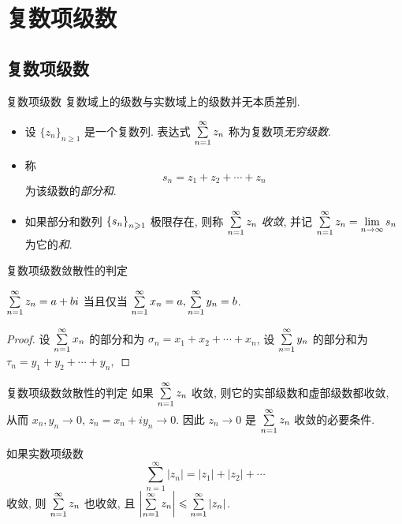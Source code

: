 \section{复数项级数}

\subsection{复数项级数}
\begin{frame}{复数项级数}
\onslide<+->
复数域上的级数与实数域上的级数并无本质差别.
\onslide<+->
\begin{definition}
\begin{itemize}
\item 设 $\{z_n\}_{n\ge1}$ 是一个复数列.
\onslide<+->
表达式 $\sum\limits_{n=1}^\infty z_n$ 称为复数项\emph{无穷级数}.
\item 称
\[s_n=z_1+z_2+\cdots+z_n\]
为该级数的\emph{部分和}.
\item 如果部分和数列 ${\left\{s_n\right\}}_{n\geqslant 1}$ 极限存在, 则称 $\sum\limits_{n=1}^\infty z_n$ \emph{收敛}, 并记 $\sum\limits_{n=1}^\infty z_n=\lim\limits_{n\to\infty}s_n$ 为它的\emph{和}.
\end{itemize}
\end{definition}
\end{frame}


\begin{frame}{复数项级数敛散性的判定}
\beqskip{7pt}
\onslide<+->
\begin{theorem}
$\sum\limits_{n=1}^\infty z_n=a+bi$ 当且仅当 $\sum\limits_{n=1}^\infty x_n=a,\sum\limits_{n=1}^\infty y_n=b$.
\end{theorem}
\onslide<+->
\begin{proof}
设 $\sum\limits_{n=1}^\infty x_n$ 的部分和为 $\sigma_n=x_1+x_2+\cdots+x_n$,
设 $\sum\limits_{n=1}^\infty y_n$ 的部分和为
$\tau_n=y_1+y_2+\cdots+y_n,$
\end{proof}
\endgroup
\end{frame}


\begin{frame}{复数项级数敛散性的判定}
\onslide<+->
如果 $\sum\limits_{n=1}^\infty z_n$ 收敛, 则它的实部级数和虚部级数都收敛,
\onslide<+->
从而 $x_n,y_n\to 0$,
\onslide<+->
$z_n=x_n+iy_n\to 0$.
\onslide<+->
因此 \alert{$z_n\to0$ 是 $\sum\limits_{n=1}^\infty z_n$ 收敛的必要条件}.
\onslide<+->
\begin{theorem}
如果实数项级数
\[\sum_{n=1}^\infty|z_n|=|z_1|+|z_2|+\cdots\]
收敛, 则 $\sum\limits_{n=1}^\infty z_n$ 也收敛, 且 $\left|\sum\limits_{n=1}^\infty z_n\right|\leqslant\sum\limits_{n=1}^\infty |z_n|$.
\end{theorem}
\end{frame}


